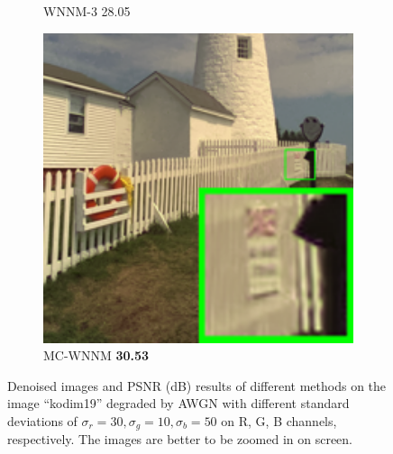 \begin{figure}
\begin{subfigure}[t]{0.19\textwidth}
		\caption{WNNM-3 28.05}
    \end{subfigure}
    \hfill
    \begin{subfigure}[t]{0.19\textwidth}
        \centering
        \includegraphics[width=1\textwidth]{images/mcwnnm/24images/resize_br_CWNNM_ADMM_nSig301050_kodim19.png}
		\caption{MC-WNNM \textbf{30.53}}
    \end{subfigure}
    \caption{Denoised images and PSNR (dB) results of different methods on the image ``kodim19'' degraded by AWGN with different standard deviations of $\sigma_{r}=30, \sigma_{g}=10, \sigma_{b}=50$ on R, G, B channels, respectively. The images are better to be zoomed in on screen.}
    \label{fig4-6}
\end{figure}


